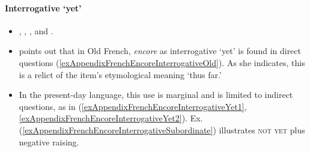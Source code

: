 \paragraph{Interrogative \lq yet\rq}
\label{appendixFrenchEncoreInterrogativeYet}
\begin{itemize}
	\item \Textcite{vanderAuwera1998}, \textcite[144]{MosegaardHansen2008}, \textcite{Martin1980}, \textcite{Muller1991} and \textcite{Vaelikangas1982}.
		\item \textcite[144]{MosegaardHansen2008} points out that in Old French, \textit{encore} as interrogative \lq yet\rq{ }is found in direct questions (\ref{exAppendixFrenchEncoreInterrogativeOld}). As she indicates, this is a relict of the item's etymological meaning \lq thus far.'
		\item In the present-day language, this use is marginal and is limited to indirect questions, as in (\ref{exAppendixFrenchEncoreInterrogativeYet1}, \ref{exAppendixFrenchEncoreInterrogativeYet2}). Ex. (\ref{exAppendixFrenchEncoreInterrogativeSubordinate}) illustrates \textsc{not yet} plus negative raising.
\end{itemize}

